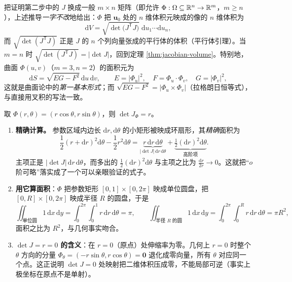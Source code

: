 \begin{remark}
把证明第二步中的 \(J\) 换成一般 \(m\times n\) 矩阵（即允许 \(\Phi:\Omega\subseteq\mathbb{R}^n\to\mathbb{R}^m\)，\(m\ge n\)），上述推导\emph{一字不改}地给出：\(\Phi\) 把 \(\mathbf{u}_0\) 处的 \(n\) 维体积元映成的像的 \(n\) 维体积为
\[
\mathrm{d}V=\sqrt{\det\bigl(J^{\mathsf T}J\bigr)}\;\mathrm{d}u_1\cdots\mathrm{d}u_n ,
\]
而 \(\sqrt{\det(J^{\mathsf T}J)}\) 正是 \(J\) 的 \(n\) 个列向量张成的平行体的体积（平行体引理）。当 \(m=n\) 时 \(\sqrt{\det(J^{\mathsf T}J)}=\lvert\det J\rvert\)，回到定理 \ref{thm:jacobian-volume}。特别地，曲面 \(\Phi(u,v)\)（\(m=3,n=2\)）的面积元为
\[
\mathrm{d}S=\sqrt{EG-F^2}\,\mathrm{d}u\,\mathrm{d}v,\qquad
E=\lvert\Phi_u\rvert^2,\quad F=\Phi_u\cdot\Phi_v,\quad G=\lvert\Phi_v\rvert^2 ,
\]
这就是曲面论中的\emph{第一基本形式}；而 \(\sqrt{EG-F^2}=\lvert\Phi_u\times\Phi_v\rvert\)（拉格朗日恒等式），与直接用叉积的写法一致。
\end{remark}

\begin{example}
取 \(\Phi(r,\theta)=(r\cos\theta,r\sin\theta)\)，则 \(\det J_\Phi=r\)。
\begin{enumerate}[label=(\arabic*)]
  \item \textbf{精确计算。} 参数区域内边长 \(\mathrm{d}r,\mathrm{d}\theta\) 的小矩形被映成环扇形，其\emph{精确}面积为
  \[
  \frac12(r+\mathrm{d}r)^2\mathrm{d}\theta-\frac12r^2\mathrm{d}\theta
  =\underbrace{r\,\mathrm{d}r\,\mathrm{d}\theta}_{\lvert\det J\rvert\,\mathrm{d}r\,\mathrm{d}\theta}
  +\underbrace{\tfrac12(\mathrm{d}r)^2\mathrm{d}\theta}_{\text{高阶项}} .
  \]
  主项正是 \(\lvert\det J\rvert\,\mathrm{d}r\,\mathrm{d}\theta\)，而多出的 \(\frac12(\mathrm{d}r)^2\mathrm{d}\theta\) 与主项之比为 \(\frac{\mathrm{d}r}{2r}\to0\)。这就把“\(o\) 阶可略”落实成了一个可以亲眼验证的式子。
  \item \textbf{用它算面积}：\(\Phi\) 把参数矩形 \([0,1]\times[0,2\pi]\) 映成单位圆盘，把 \([0,R]\times[0,2\pi]\) 映成半径 \(R\) 的圆盘，于是
  \[
  \iint_{\text{单位圆}}1\,\mathrm{d}x\,\mathrm{d}y=\int_0^{2\pi}\!\!\int_0^1 r\,\mathrm{d}r\,\mathrm{d}\theta=\pi,
  \qquad
  \iint_{\text{半径 }R\text{ 的圆}}1\,\mathrm{d}x\,\mathrm{d}y=\int_0^{2\pi}\!\!\int_0^R r\,\mathrm{d}r\,\mathrm{d}\theta=\pi R^2 ,
  \]
  面积之比为 \(R^2\)，与几何事实吻合。
  \item \textbf{\(\det J=r=0\) 的含义}：在 \(r=0\)（原点）处伸缩率为零。几何上 \(r=0\) 时整个 \(\theta\) 方向的分量 \(\Phi_\theta=(-r\sin\theta,r\cos\theta)=\mathbf 0\) 退化成零向量，所有 \(\theta\) 对应同一个点。这正说明 \(\det J=0\) 处映射把二维体积压成零，不能局部可逆（事实上极坐标在原点不是单射）。
\end{enumerate}
\end{example}

